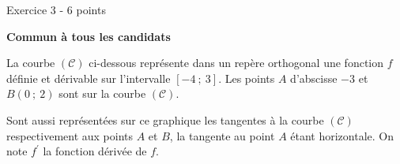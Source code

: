 
%
\begin{h2}Exercice 3 - 6 points\end{h2}
\textbf{Commun à tous les candidats}
\par
La courbe $(\mathscr{C})$ ci-dessous représente dans un repère orthogonal une fonction $f$ définie et dérivable sur l'intervalle $[-4~;~3]$. Les points $A$ d'abscisse $-3$ et $B(0~;~2)$ sont sur la courbe $(\mathscr{C})$.
\par
Sont aussi représentées sur ce graphique les tangentes à la courbe $(\mathscr{C})$ respectivement aux points $A$ et $B$, la tangente au point $A$ étant horizontale. On note $f^\prime$ la fonction dérivée de $f$.

\begin{center}
\end{center}

